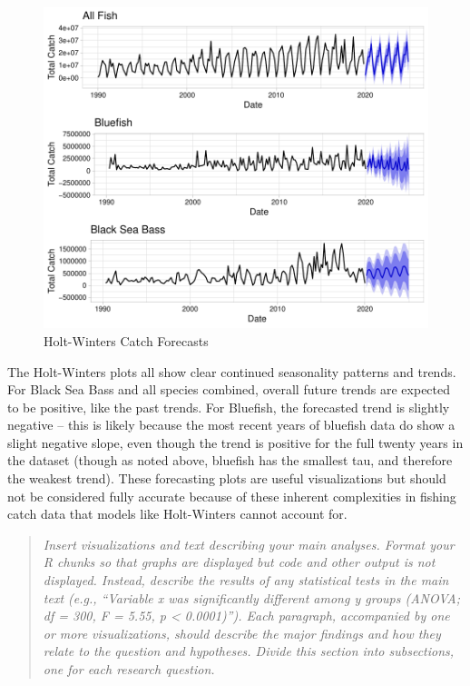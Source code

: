 \documentclass[
  12pt,
]{article}
\begin{document}
\begin{figure}[H]

\hfill{}\includegraphics{Report_FishTrends_files/figure-latex/unnamed-chunk-1-1} 

\caption{Holt-Winters Catch Forecasts}\label{fig:unnamed-chunk-1}
\end{figure}

The Holt-Winters plots all show clear continued seasonality patterns and
trends. For Black Sea Bass and all species combined, overall future
trends are expected to be positive, like the past trends. For Bluefish,
the forecasted trend is slightly negative -- this is likely because the
most recent years of bluefish data do show a slight negative slope, even
though the trend is positive for the full twenty years in the dataset
(though as noted above, bluefish has the smallest tau, and therefore the
weakest trend). These forecasting plots are useful visualizations but
should not be considered fully accurate because of these inherent
complexities in fishing catch data that models like Holt-Winters cannot
account for.

\begin{quote}
\emph{Insert visualizations and text describing your main analyses.
Format your R chunks so that graphs are displayed but code and other
output is not displayed. Instead, describe the results of any
statistical tests in the main text (e.g., ``Variable x was significantly
different among y groups (ANOVA; df = 300, F = 5.55, p \textless{}
0.0001)''). Each paragraph, accompanied by one or more visualizations,
should describe the major findings and how they relate to the question
and hypotheses. Divide this section into subsections, one for each
research question.}
\end{quote}
\end{document}
